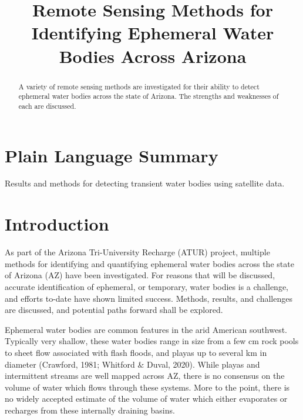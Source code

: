 \documentclass[
]{agujournal2019}
\begin{document}
\title{Remote Sensing Methods for Identifying Ephemeral Water Bodies
Across Arizona}



\begin{abstract}
A variety of remote sensing methods are investigated for their ability
to detect ephemeral water bodies across the state of Arizona. The
strengths and weaknesses of each are discussed.
\end{abstract}

\section*{Plain Language Summary}
Results and methods for detecting transient water bodies using satellite
data.




\section{Introduction}\label{introduction}

As part of the Arizona Tri-University Recharge (ATUR) project, multiple
methods for identifying and quantifying ephemeral water bodies across
the state of Arizona (AZ) have been investigated. For reasons that will
be discussed, accurate identification of ephemeral, or temporary, water
bodies is a challenge, and efforts to-date have shown limited success.
Methods, results, and challenges are discussed, and potential paths
forward shall be explored.

Ephemeral water bodies are common features in the arid American
southwest. Typically very shallow, these water bodies range in size from
a few cm rock pools to sheet flow associated with flash floods, and
playas up to several km in diameter (Crawford, 1981; Whitford \& Duval,
2020). While playas and intermittent streams are well mapped across AZ,
there is no consensus on the volume of water which flows through these
systems. More to the point, there is no widely accepted estimate of the
volume of water which either evaporates or recharges from these
internally draining basins.
\end{document}

